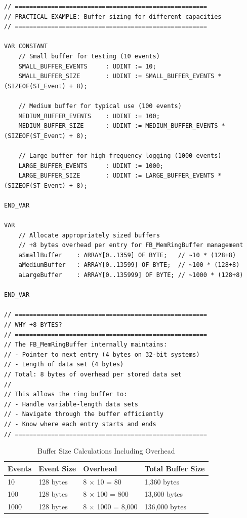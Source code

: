 \documentclass[11pt,a4paper]{article}
\begin{document}
\begin{lstlisting}
// =====================================================
// PRACTICAL EXAMPLE: Buffer sizing for different capacities
// =====================================================

VAR CONSTANT
    // Small buffer for testing (10 events)
    SMALL_BUFFER_EVENTS     : UDINT := 10;
    SMALL_BUFFER_SIZE       : UDINT := SMALL_BUFFER_EVENTS * (SIZEOF(ST_Event) + 8);
    
    // Medium buffer for typical use (100 events)
    MEDIUM_BUFFER_EVENTS    : UDINT := 100;
    MEDIUM_BUFFER_SIZE      : UDINT := MEDIUM_BUFFER_EVENTS * (SIZEOF(ST_Event) + 8);
    
    // Large buffer for high-frequency logging (1000 events)
    LARGE_BUFFER_EVENTS     : UDINT := 1000;
    LARGE_BUFFER_SIZE       : UDINT := LARGE_BUFFER_EVENTS * (SIZEOF(ST_Event) + 8);
    
END_VAR

VAR
    // Allocate appropriately sized buffers
    // +8 bytes overhead per entry for FB_MemRingBuffer management
    aSmallBuffer    : ARRAY[0..1359] OF BYTE;   // ~10 * (128+8)
    aMediumBuffer   : ARRAY[0..13599] OF BYTE;  // ~100 * (128+8)
    aLargeBuffer    : ARRAY[0..135999] OF BYTE; // ~1000 * (128+8)
    
END_VAR

// =====================================================
// WHY +8 BYTES?
// =====================================================
// The FB_MemRingBuffer internally maintains:
// - Pointer to next entry (4 bytes on 32-bit systems)
// - Length of data set (4 bytes)
// Total: 8 bytes of overhead per stored data set
//
// This allows the ring buffer to:
// - Handle variable-length data sets
// - Navigate through the buffer efficiently
// - Know where each entry starts and ends
// =====================================================
\end{lstlisting}

\begin{table}[h]
\centering
\begin{tabular}{@{}llll@{}}
\toprule
\textbf{Events} & \textbf{Event Size} & \textbf{Overhead} & \textbf{Total Buffer Size} \\
\midrule
10 & 128 bytes & 8 $\times$ 10 = 80 & 1,360 bytes \\
100 & 128 bytes & 8 $\times$ 100 = 800 & 13,600 bytes \\
1000 & 128 bytes & 8 $\times$ 1000 = 8,000 & 136,000 bytes \\
\bottomrule
\end{tabular}
\caption{Buffer Size Calculations Including Overhead}
\end{table}
\end{document}
